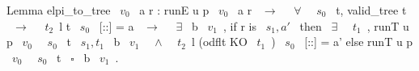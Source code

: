 \begin{coqcode}
Lemma elpi_to_tree ~$v_0$~ a r : 
  runE u p ~$v_0$~ a r ~$\to$~ 
  ~$\forall$~ ~$s_0$~ t, valid_tree t ~$\to$~ ~$t_2$~l t ~$s_0$~ [::] = a ~$\to$~  
  ~$\exists$~ b ~$v_1$~,
  if r is ~$\boxed{s_1, a'}$~ then 
    ~$\exists$~ ~$t_1$~, runT u p ~$v_0$~ ~$s_0$~ t ~$\boxed{s_1, t_1}$~ b ~$v_1$~ ~$\land$~ ~$t_2$~l (odflt KO ~$t_1$~) ~$s_0$~ [::] = a'
  else runT u p ~$v_0$~ ~$s_0$~ t ~$\square$~ b ~$v_1$~.
\end{coqcode}
